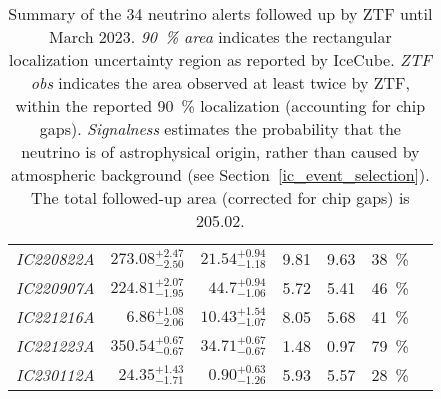 \begin{table*}
\begin{tabular}{l r r r r c c}
    \emph{IC220822A} & $273.08^{+2.47}_{-2.50}$ & $21.54^{+0.94}_{-1.18}$  & 9.81                 & 9.63                 & \SI{38}{\percent}  & \cite{IC220822A1, IC220822A2}                         \\
    \emph{IC220907A} & $224.81^{+2.07}_{-1.95}$ & $44.7^{+0.94}_{-1.06}$   & 5.72                 & 5.41                 & \SI{46}{\percent}  & \cite{IC220907A1, IC220907A2, IC220907A3}             \\
    \emph{IC221216A} & $6.86^{+1.08}_{-2.06}$   & $10.43^{+1.54}_{-1.07}$  & 8.05                 & 5.68                 & \SI{41}{\percent}  & \cite{IC221216A1, IC221216A2}                         \\
    \emph{IC221223A} & $350.54^{+0.67}_{-0.67}$ & $34.71^{+0.67}_{-0.67}$  & 1.48                 & 0.97                 & \SI{79}{\percent}  & \cite{IC221223A1, IC221223A2}                         \\
    \emph{IC230112A} & $24.35^{+1.43}_{-1.71}$  & $0.90^{+0.63}_{-1.26}$   & 5.93                 & 5.57                 & \SI{28}{\percent}  & \cite{IC230112A1, IC230112A2}                         \\
    \hline
  \end{tabular}
  \caption[Summary of the 34 neutrino alerts followed up by ZTF]{Summary of the 34 neutrino alerts followed up by ZTF until March 2023. \textit{\SI{90}{\percent} area} indicates the rectangular localization uncertainty region as reported by IceCube. \textit{ZTF obs} indicates the area observed at least twice by ZTF, within the reported \SI{90}{\percent} localization (accounting for chip gaps). \textit{Signalness} estimates the probability that the neutrino is of astrophysical origin, rather than caused by atmospheric background (see Section~\ref{ic_event_selection}). The total followed-up area (corrected for chip gaps) is \SI{205.02}{\square\deg}.}
  \label{tab:neutrino_alert_overview}
\end{table*}

